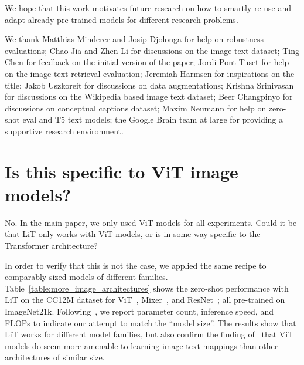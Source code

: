 \documentclass[10pt,twocolumn,letterpaper]{article}
\makeatletter
\def \lit {LiT\xspace}
\renewcommand{\paragraph}{\@startsection{paragraph}{4}{\z@}{1.75ex \@plus 1ex \@minus .2ex}{-1em}{\normalfont\normalsize\bfseries}}
\makeatother
\begin{document}
We hope that this work motivates future research on how to smartly re-use and adapt already pre-trained models for different research problems.

\paragraph{Acknowledgements} 
We thank Matthias Minderer and Josip Djolonga for help on robustness evaluations; Chao Jia and Zhen Li for discussions on the image-text dataset; Ting Chen for feedback on the initial version of the paper; Jordi Pont-Tuset for help on the image-text retrieval evaluation; Jeremiah Harmsen for inspirations on the title; Jakob Uszkoreit for discussions on data augmentations; Krishna Srinivasan for discussions on the Wikipedia based image text dataset; Beer Changpinyo for discussions on conceptual captions dataset; Maxim Neumann for help on zero-shot eval and T5 text models; the Google Brain team at large for providing a supportive research environment.

{\small


}

\clearpage
\appendix



\section{Is this specific to ViT image models?}
\label{sec:more_image_architectures}

No.
In the main paper, we only used ViT models for all experiments. Could it be that \lit only works with ViT models, or is in some way specific to the Transformer architecture?

In order to verify that this is not the case, we applied the same recipe to comparably-sized models of different families. Table~\ref{table:more_image_architectures} shows the zero-shot performance with \lit on the CC12M dataset for ViT~\cite{vit}, Mixer~\cite{mixer}, and ResNet~\cite{bit}; all pre-trained on ImageNet21k. Following~\cite{efficiency_misnomer}, we report parameter count, inference speed, and FLOPs to indicate our attempt to match the “model size”. The results show that \lit works for different model families, but also confirm the finding of~\cite{clip} that ViT models do seem more amenable to learning image-text mappings than other architectures of similar size.
\end{document}
